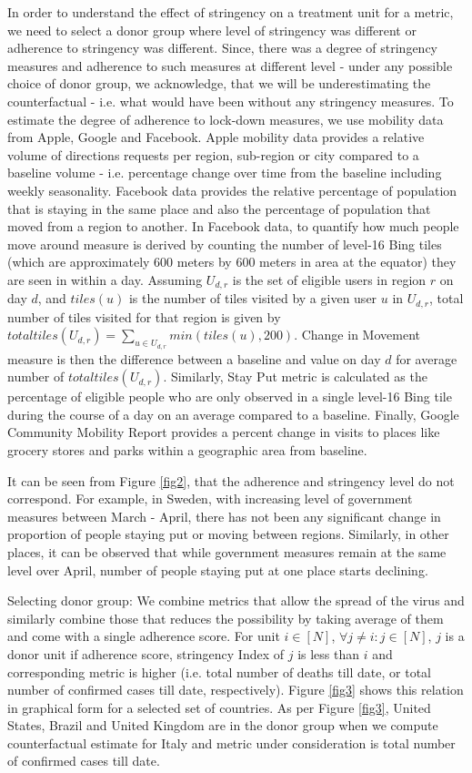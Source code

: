 \documentclass[preprint,authoryear,12pt]{elsarticle}
\begin{document}
    In order to understand the effect of stringency on a treatment unit for a metric, we need to select a donor group where level of stringency was different or adherence to stringency was different. Since, there was a degree of stringency measures and adherence to such measures at different level - under any possible choice of donor group, we acknowledge, that we will be underestimating the counterfactual - i.e. what would have been without any stringency measures. To estimate the degree of adherence to lock-down measures, we use mobility data from Apple, Google and Facebook. Apple mobility data provides a relative volume of directions requests per region, sub-region or city compared to a baseline volume - i.e. percentage change over time from the baseline including weekly seasonality. Facebook data provides the relative percentage of population that is staying in the same place and also the percentage of population that moved from a region to another.  In Facebook data, to quantify how much people move around measure is derived by counting the number of level-16 Bing tiles (which are approximately 600 meters by 600 meters in area at the equator) they are seen in within a day. Assuming $U_{d,r}$ is the set of eligible users in region $r$ on day $d$, and $tiles(u)$ is the number of tiles visited by a given user $u$ in $U_{d,r}$, total number of tiles visited for that region is given by $totaltiles(U_{d,r}) = \sum_{u \in U_{d,r}} min(tiles(u), 200)$. Change in Movement measure is then the difference between a baseline and value on day $d$ for average number of $totaltiles(U_{d,r})$. Similarly, Stay Put metric is calculated as the percentage of eligible people who are only observed in a single level-16 Bing tile during the course of a day on an average compared to a baseline. Finally, Google Community Mobility Report provides a percent change in visits to places like grocery stores and parks within a geographic area from baseline.
    
    It can be seen from Figure \ref{fig2}, that the adherence  and stringency level do not correspond. For example, in Sweden, with increasing level of government measures between March - April, there has not been any significant change in proportion of people staying put or moving between regions. Similarly, in other places, it can be observed that while government measures remain at the same level over April, number of people staying put at one place starts declining. 
    
    Selecting donor group: We combine metrics that allow the spread of the virus and similarly combine those that reduces the possibility by taking average of them and come with a single adherence score. For unit $i \in [N]$, $\forall j \neq i : j \in [N]$, $j$ is a donor unit if adherence score, stringency Index of $j$ is less than $i$ and corresponding metric is higher (i.e. total number of deaths till date, or total number of confirmed cases till date, respectively). Figure \ref{fig3} shows this relation in graphical form for a selected set of countries. As per Figure \ref{fig3}, United States, Brazil and United Kingdom are in the donor group when we compute counterfactual estimate for Italy and metric under consideration is total number of confirmed cases till date. 
    
\end{document}

